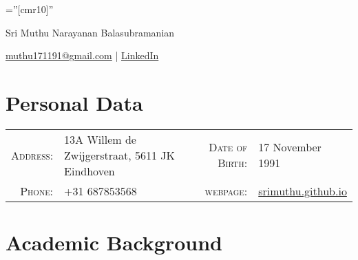 \documentclass[a4paper,10pt]{article} %
\begin{document}
\pagestyle{empty} %

\font\fb=''[cmr10]'' %


\par{\LARGE Sri Muthu Narayanan Balasubramanian\par}
\href{mailto:muthu171191@gmail.com}{muthu171191@gmail.com} | \href{https://nl.linkedin.com/in/sri-muthu-narayanan-balasubramanian-45027266}{LinkedIn}

\section{Personal Data}

\begin{tabular}{rlrl}
\textsc{Address:} & 13A Willem de Zwijgerstraat, 5611 JK Eindhoven &
\textsc{Date of Birth:} & 17 November 1991 \\
\textsc{Phone:} & +31 687853568 & 
\textsc{webpage:} & \href{http://srimuthu.github.io}{srimuthu.github.io}
\end{tabular}
\section{Academic Background}
\end{document}
